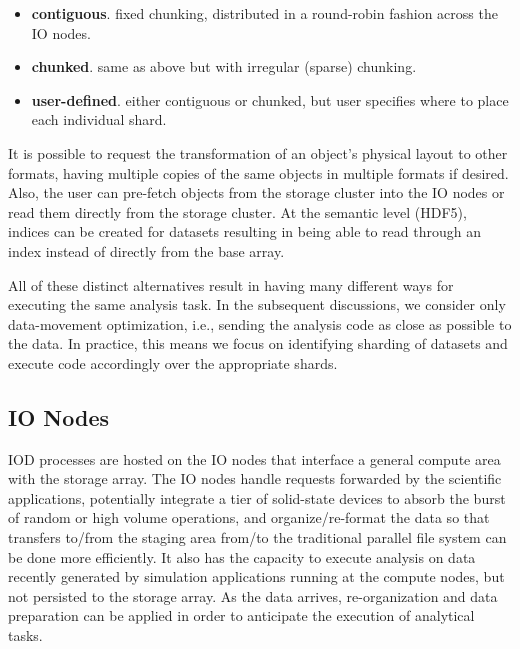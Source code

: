 \documentclass[conference]{IEEEtran}
\begin{document}
\begin{itemize}
\itemsep1pt\parskip0pt
\item
  \textbf{contiguous}. fixed chunking, distributed in a round-robin
  fashion across the IO nodes.
\item
  \textbf{chunked}. same as above but with irregular (sparse) chunking.
\item
  \textbf{user-defined}. either contiguous or chunked, but user specifies
  where to place each individual shard.
\end{itemize}

It is possible to request the transformation of an object's physical
layout to other formats, having multiple copies of the same objects in
multiple formats if desired. Also, the user can pre-fetch objects from
the storage cluster into the IO nodes or read them directly from the
storage cluster. At the semantic level (HDF5), indices can be created
for datasets resulting in being able to read through an index instead of
directly from the base array.

All of these distinct alternatives result in having many different ways for
executing the same analysis task.  In the subsequent discussions, we consider
only data-movement optimization, i.e., sending the analysis code as close as
possible to the data. In practice, this means we focus on identifying sharding
of datasets and execute code accordingly over the appropriate shards.

\subsection{IO Nodes}
IOD processes are hosted on the IO nodes that interface a general compute area
with the storage array. The IO nodes handle requests forwarded by the
scientific applications, potentially integrate a tier of solid-state devices to
absorb the burst of random or high volume operations, and organize/re-format
the data so that transfers to/from the staging area from/to the traditional
parallel file system can be done more efficiently. It also has the capacity to
execute analysis on data recently generated by simulation applications running
at the compute nodes, but not persisted to the storage array. As the data
arrives, re-organization and data preparation can be applied in order to
anticipate the execution of analytical tasks.
\end{document}
